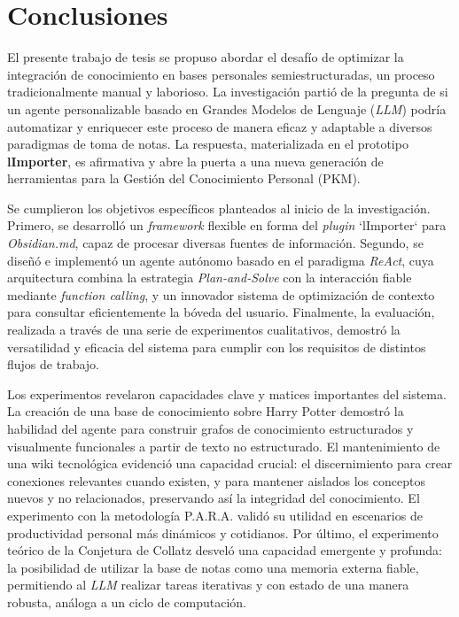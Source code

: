 \chapter*{Conclusiones}

El presente trabajo de tesis se propuso abordar el desafío de optimizar la integración de conocimiento en bases personales semiestructuradas, un proceso tradicionalmente manual y laborioso. La investigación partió de la pregunta de si un agente personalizable basado en Grandes Modelos de Lenguaje (\textit{LLM}) podría automatizar y enriquecer este proceso de manera eficaz y adaptable a diversos paradigmas de toma de notas. La respuesta, materializada en el prototipo \textbf{lImporter}, es afirmativa y abre la puerta a una nueva generación de herramientas para la Gestión del Conocimiento Personal (PKM).

Se cumplieron los objetivos específicos planteados al inicio de la investigación. Primero, se desarrolló un \textit{framework} flexible en forma del \textit{plugin} `lImporter` para \textit{Obsidian.md}, capaz de procesar diversas fuentes de información. Segundo, se diseñó e implementó un agente autónomo basado en el paradigma \textit{ReAct}, cuya arquitectura combina la estrategia \textit{Plan-and-Solve} con la interacción fiable mediante \textit{function calling}, y un innovador sistema de optimización de contexto para consultar eficientemente la bóveda del usuario. Finalmente, la evaluación, realizada a través de una serie de experimentos cualitativos, demostró la versatilidad y eficacia del sistema para cumplir con los requisitos de distintos flujos de trabajo.

Los experimentos revelaron capacidades clave y matices importantes del sistema. La creación de una base de conocimiento sobre Harry Potter demostró la habilidad del agente para construir grafos de conocimiento estructurados y visualmente funcionales a partir de texto no estructurado. El mantenimiento de una wiki tecnológica evidenció una capacidad crucial: el discernimiento para crear conexiones relevantes cuando existen, y para mantener aislados los conceptos nuevos y no relacionados, preservando así la integridad del conocimiento. El experimento con la metodología P.A.R.A. validó su utilidad en escenarios de productividad personal más dinámicos y cotidianos. Por último, el experimento teórico de la Conjetura de Collatz desveló una capacidad emergente y profunda: la posibilidad de utilizar la base de notas como una memoria externa fiable, permitiendo al \textit{LLM} realizar tareas iterativas y con estado de una manera robusta, análoga a un ciclo de computación.

